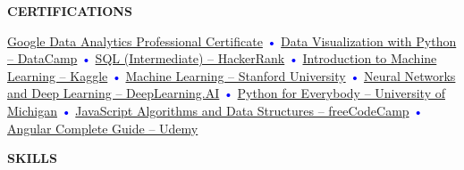 \documentclass[11pt]{article}
\newcommand{\SectionBox}[1]{%
\vspace{6pt}
\begin{tcolorbox}[
    colback=black!10,    %
    colframe=black!10,   %
    boxrule=0pt,        %
    arc=8pt,            %
    left=5pt, right=5pt, top=4pt, bottom=4pt,
    width=\textwidth,   %
    halign=center,      %
    valign=center       %
]
\textbf{\large #1}
\end{tcolorbox}
\vspace{-1pt}
}
\newcommand{\CertificationsSection}[0]{\SectionBox{CERTIFICATIONS}}
\newcommand{\SkillsSection}[0]{\SectionBox{SKILLS}} %
\begin{document}
\CertificationsSection
\href{https://www.coursera.org/professional-certificates/google-data-analytics}{Google Data Analytics Professional Certificate} 
\textcolor{blue}{\Large •} 
\href{https://www.datacamp.com/courses/data-visualization-with-python}{Data Visualization with Python – DataCamp} 
\textcolor{blue}{\Large •} 
\href{https://www.hackerrank.com/skills-verification/sql_intermediate}{SQL (Intermediate) – HackerRank} 
\textcolor{blue}{\Large •} 
\href{https://www.kaggle.com/learn/intro-to-machine-learning}{Introduction to Machine Learning – Kaggle} 
\textcolor{blue}{\Large •} 
\href{https://www.coursera.org/learn/machine-learning}{Machine Learning – Stanford University} 
\textcolor{blue}{\Large •} 
\href{https://www.coursera.org/learn/neural-networks-deep-learning}{Neural Networks and Deep Learning – DeepLearning.AI} 
\textcolor{blue}{\Large •} 
\href{https://www.coursera.org/specializations/python}{Python for Everybody – University of Michigan} 
\textcolor{blue}{\Large •} 
\href{https://www.freecodecamp.org/learn/javascript-algorithms-and-data-structures/}{JavaScript Algorithms and Data Structures – freeCodeCamp} 
\textcolor{blue}{\Large •} 
\href{https://www.udemy.com/course/angular-complete-guide/}{Angular Complete Guide – Udemy}


\SkillsSection
\vspace{-0.1cm} %

\noindent\parbox[t]{\textwidth}{ %

    \noindent\parbox{\textwidth}{ %
        \hskip 3pt%
        \hskip 3pt%
        \hskip 3pt%
        \hskip 3pt%
        \hskip 3pt%
        \hskip 3pt%
        \hskip 3pt%
        \hskip 3pt%
        \hskip 3pt%
        \hskip 3pt%
        \hskip 3pt%
        \hskip 3pt%
        \hskip 3pt%
        \hskip 3pt%
        \hskip 3pt%
        \hskip 3pt%
        \hskip 3pt%
        \hskip 3pt%
        \hskip 3pt%
    }
} %
\end{document}
